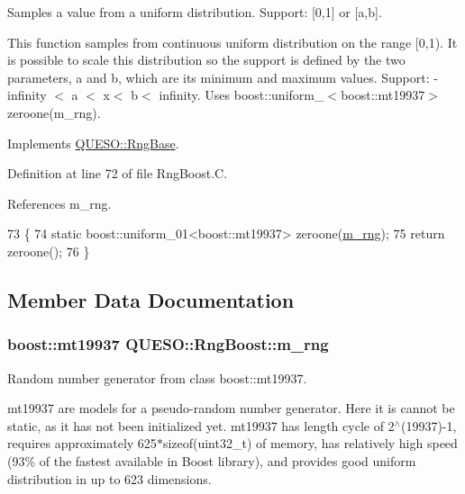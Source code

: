 Samples a value from a uniform distribution. Support\-: \mbox{[}0,1\mbox{]} or \mbox{[}a,b\mbox{]}. 

This function samples from continuous uniform distribution on the range \mbox{[}0,1). It is possible to scale this distribution so the support is defined by the two parameters, a and b, which are its minimum and maximum values. Support\-: -\/infinity $<$ a $<$ x$<$ b$<$ infinity. Uses boost\-::uniform\-\_$<$boost\-::mt19937$>$ zeroone(m\-\_\-rng). 

Implements \hyperlink{class_q_u_e_s_o_1_1_rng_base_aed8342f0c8a4ac0a311cce9cac2b67e5}{Q\-U\-E\-S\-O\-::\-Rng\-Base}.



Definition at line 72 of file Rng\-Boost.\-C.



References m\-\_\-rng.


\begin{DoxyCode}
73 \{
74   \textcolor{keyword}{static} boost::uniform\_01<boost::mt19937> zeroone(\hyperlink{class_q_u_e_s_o_1_1_rng_boost_aef65914cae8b11e345bfb082db616f0e}{m\_rng});
75   \textcolor{keywordflow}{return} zeroone();
76 \}
\end{DoxyCode}


\subsection{Member Data Documentation}
\hypertarget{class_q_u_e_s_o_1_1_rng_boost_aef65914cae8b11e345bfb082db616f0e}{
\subsubsection[{m\-\_\-rng}]{\setlength{\rightskip}{0pt plus 5cm}boost\-::mt19937 Q\-U\-E\-S\-O\-::\-Rng\-Boost\-::m\-\_\-rng\hspace{0.3cm}{\ttfamily [private]}}}\label{class_q_u_e_s_o_1_1_rng_boost_aef65914cae8b11e345bfb082db616f0e}


Random number generator from class boost\-::mt19937. 

mt19937 are models for a pseudo-\/random number generator. Here it is cannot be static, as it has not been initialized yet. mt19937 has length cycle of 2$^\wedge$(19937)-\/1, requires approximately 625$\ast$sizeof(uint32\-\_\-t) of memory, has relatively high speed (93\% of the fastest available in Boost library), and provides good uniform distribution in up to 623 dimensions. 

